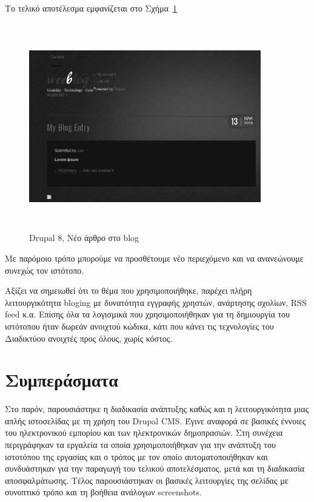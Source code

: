 \documentclass[12pt]{report}
\begin{document}
Το τελικό αποτέλεσμα εμφανίζεται στο Σχήμα~\ref{fig:drupal_blog_entry}
\begin{figure}[H]
\centering
\includegraphics[width=0.9\textwidth, height=9cm]{drupal-blog-entry-gray}
\caption{\textlatin{Drupal 8}, Νέο άρθρο στο \textlatin{blog}}
\label{fig:drupal_blog_entry}
\end{figure}

Με παρόμοιο τρόπο μπορούμε να προσθέτουμε νέο περιεχόμενο και να ανανεώνουμε συνεχώς τον ιστότοπο.

Αξίζει να σημειωθεί ότι το θέμα που χρησιμοποιήθηκε, παρέχει πλήρη λειτουργικότητα \textlatin{bloging} με δυνατότητα εγγραφής χρηστών, ανάρτησης σχολίων, \textlatin{RSS feed} κ.α. Επίσης όλα τα λογισμικά που χρησιμοποιήθηκαν για τη δημιουργία του ιστότοπου ήταν δωρεάν ανοιχτού κώδικα, κάτι που κάνει τις τεχνολογίες του Διαδικτύου ανοιχτές προς όλους, χωρίς κόστος.

\section{Συμπεράσματα}
Στο παρόν, παρουσιάστηκε η διαδικασία ανάπτυξης καθώς και η λειτουργικότητα μιας απλής ιστοσελίδας με τη χρήση του \textlatin{Drupal CMS}. Έγινε αναφορά σε βασικές έννοιες του ηλεκτρονικού εμπορίου και των ηλεκτρονικών δημοπρασιών. Στη συνέχεια περιγράφηκαν τα εργαλεία τα οποία χρησιμοποιήθηκαν για την ανάπτυξη του ιστοτόπου της εργασίας και ο τρόπος με τον οποίο αυτοματοποιήθηκαν και συνδυάστηκαν για την παραγωγή του τελικού αποτελέσματος, μετά και τη διαδικασία αποσφαλμάτωσης. Τέλος παρουσιάστηκαν οι βασικές λειτουργίες της σελίδας με συνοπτικό τρόπο και τη βοήθεια ανάλογων \textlatin{screenshots}.
\end{document}
